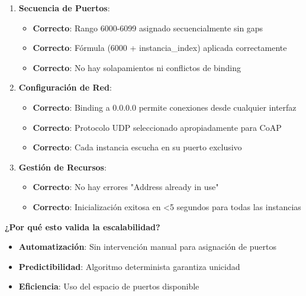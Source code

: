 \begin{enumerate}
    \item \textbf{Secuencia de Puertos}:
    \begin{itemize}
        \item \textcolor{successgreen}{\textbf{Correcto}}: Rango 6000-6099 asignado secuencialmente sin gaps
        \item \textcolor{successgreen}{\textbf{Correcto}}: Fórmula (6000 + instancia\_index) aplicada correctamente
        \item \textcolor{successgreen}{\textbf{Correcto}}: No hay solapamientos ni conflictos de binding
    \end{itemize}
    
    \item \textbf{Configuración de Red}:
    \begin{itemize}
        \item \textcolor{successgreen}{\textbf{Correcto}}: Binding a 0.0.0.0 permite conexiones desde cualquier interfaz
        \item \textcolor{successgreen}{\textbf{Correcto}}: Protocolo UDP seleccionado apropiadamente para CoAP
        \item \textcolor{successgreen}{\textbf{Correcto}}: Cada instancia escucha en su puerto exclusivo
    \end{itemize}
    
    \item \textbf{Gestión de Recursos}:
    \begin{itemize}
        \item \textcolor{successgreen}{\textbf{Correcto}}: No hay errores "Address already in use"
        \item \textcolor{successgreen}{\textbf{Correcto}}: Inicialización exitosa en <5 segundos para todas las instancias
    \end{itemize}
\end{enumerate}

\textbf{¿Por qué esto valida la escalabilidad?}
\begin{itemize}
    \item \textbf{Automatización}: Sin intervención manual para asignación de puertos
    \item \textbf{Predictibilidad}: Algoritmo determinista garantiza unicidad
    \item \textbf{Eficiencia}: Uso del espacio de puertos disponible
\end{itemize}

